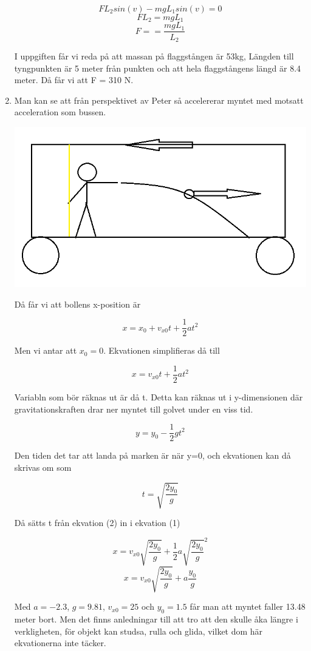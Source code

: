 \documentclass[a4paper,12pt]{article}
\begin{document}
\begin{enumerate}
            $$FL_2sin(v)-mgL_1sin(v)=0$$
            $$FL_2=mgL_1$$
            $$F==\frac{mgL_1}{L_2}$$

            I uppgiften får vi reda på att massan på flaggstången är 53kg, Längden till
            tyngpunkten är 5 meter från punkten och att hela flaggstångens längd
            är 8.4 meter. Då får vi att F = 310 N.

      \item

            Man kan se att från perspektivet av Peter så accelererar myntet
            med motsatt acceleration som bussen.

            \includegraphics[scale=0.5]{Figur3.png}

            Då får vi att bollens x-position är

            $$x=x_0+v_{x0}t+\frac{1}{2}at^2$$

            Men vi antar att $x_0=0$.
            Ekvationen simplifieras då till

            \begin{equation}
                  x=v_{x0}t + \frac{1}{2}at^2
            \end{equation}

            Variabln som bör räknas ut är då t.
            Detta kan räknas ut i y-dimensionen där gravitationskraften
            drar ner myntet till golvet under en viss tid.

            $$y=y_0-\frac{1}{2}gt^2$$

            Den tiden det tar att landa på marken är när y=0,
            och ekvationen kan då skrivas om som

            \begin{equation}
                  t=\sqrt{\frac{2y_0}{g}}
            \end{equation}

            Då sätts t från ekvation (2) in i ekvation (1)

            $$x=v_{x0}\sqrt{\frac{2y_0}{g}} + \frac{1}{2}a\sqrt{\frac{2y_0}{g}}^2$$
            $$x=v_{x0}\sqrt{\frac{2y_0}{g}} + a\frac{y_0}{g}$$

            Med $a=-2.3$, $g=9.81$, $v_{x0}=25$ och $y_0=1.5$ får man att
            myntet faller 13.48 meter bort. Men det finns anledningar
            till att tro att den skulle åka längre i verkligheten, för
            objekt kan studsa, rulla och glida, vilket dom här
            ekvationerna inte täcker.

\end{enumerate}
\end{document}
